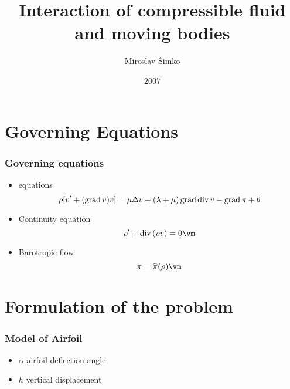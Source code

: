 \documentclass{beamer}
\title{Interaction of compressible fluid\\ and moving bodies}
\author{Miroslav Šimko}
\institute{Charles University in Prague\\Faculty of Mathematics and Physics}
\date{2007}
\begin{document}


\frame{\titlepage}
\frame{\tableofcontents}

\section{Governing Equations}

\begin{comment}
\frame
{
	\frametitle{Equation of motion}
	$$\dv T+b=\rho[v'+(\grad v)v] \vm$$
	
	\begin{itemize}
		\item $T$ \tu{Cauchy stress}
		\item $b$ volume forces
		\item $\rho$ density in motion
		\item $v$ velocity
	\end{itemize}
}

\frame
{
	\frametitle{Compressible Newtonian fluid}
	$$T = -\pi I + C[L] \vm$$
	$$C[L]=2\mu D + \lambda (\tr L)I \vm$$
	
	\begin{itemize}
		\item $\mu, \lambda$ \tu{viscosity coefficients} of the fluid
		\item $D$ symmetric part of velocity gradient $L$
	\end{itemize}
}
\end{comment}

\frame
{
	\frametitle{Governing equations}
	\begin{itemize}
    	\item {} equations
		$$\rho[v'+(\mbox{grad}\,v)v]=\mu\Delta v+(\lambda+\mu)\,\mbox{grad}\,\mbox{div}\,v -\mbox{grad}\,\pi + b$$
		\pause
    	\item Continuity equation
		$$\rho'+\dv(\rho v)=0 \vm$$
		\pause
    	\item Barotropic flow
		$$\pi=\widehat\pi(\rho) \vm$$
	\end{itemize}
}

\section{Formulation of the problem}

\frame
{
	\frametitle{Model of Airfoil}
	\begin{itemize}
		\item $\alpha$ airfoil deflection angle
		\item $h$ vertical displacement
	\end{itemize}
}
\end{document}

